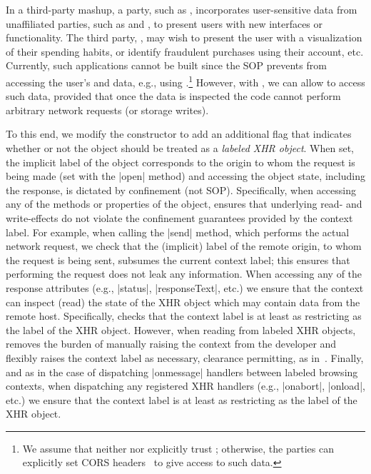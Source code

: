 In a third-party mashup, a party, such as ,
incorporates user-sensitive data from unaffiliated parties, such as
 and , to present users with new
interfaces or functionality.
%
The third party, , may wish to present the user with a
visualization of their spending habits, or identify fraudulent
 purchases using their  account, etc.
%
Currently, such applications cannot be built since the SOP prevents
 from accessing the user's  and
 data, e.g., using \xhr{}.\footnote{
 We assume that neither  nor 
 explicitly trust ; otherwise, the parties can
 explicitly set CORS headers~ to give 
 access to such data.
}
%
However, with \sys{}, we can allow  to access such
data, provided that once the data is inspected the code cannot perform
arbitrary network requests (or storage writes).
 
To this end, we modify the \xhr{} constructor to add an additional
flag that indicates whether or not the object should be treated as a
\emph{labeled XHR object}.
%
When set, the implicit label of the object corresponds to the origin
to whom the request is being made (set with the \js|open| method) and
accessing the object state, including the response, is dictated by
confinement (not SOP).
%
Specifically, when accessing any of the methods or properties of
the object, \sys{} ensures that underlying read- and write-effects do
not violate the confinement guarantees provided by the context label.
%
For example, when calling the \js|send| method, which performs the
actual network request, we check that the (implicit) label of the
remote origin, to whom the request is being sent, subsumes the current
context label;
%
this ensures that performing the request does not leak any
information.
%
When accessing any of the response attributes (e.g., \js|status|,
\js|responseText|, etc.) we ensure that the context can inspect (read)
the state of the XHR object which may contain data from the remote
host.
%
Specifically, \sys{} checks that the context label is at least as
restricting as the label of the XHR object.
%
However, when reading from labeled XHR objects, \sys{} removes the
burden of manually raising the context from the developer and flexibly
raises the context label as necessary, clearance permitting, as
in~.
%
Finally, and as in the case of dispatching \js|onmessage| handlers
between labeled browsing contexts, when dispatching any registered XHR
handlers (e.g., \js|onabort|, \js|onload|, etc.) we ensure that the
context label is at least as restricting as the label of the XHR
object.
 
